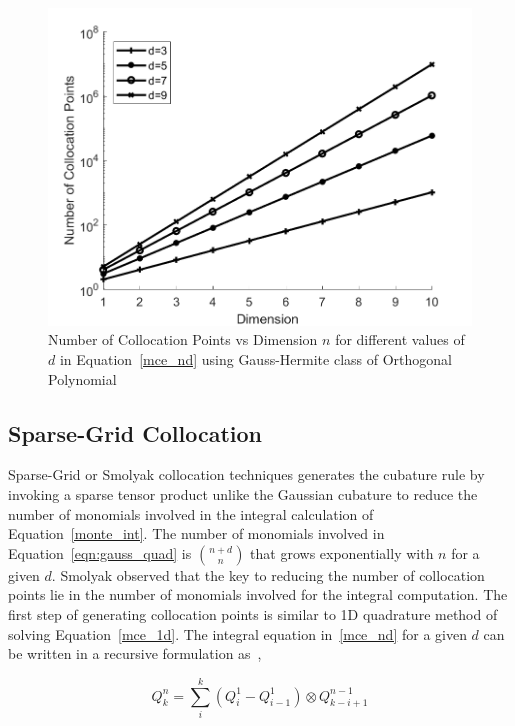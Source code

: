 \begin{figure}[H]
\centering
\includegraphics[width=\textwidth]{intr_figs/gauss_hermite}
\caption{Number of Collocation Points vs Dimension $n$ for different values of $d$ in Equation~\ref{mce_nd} using Gauss-Hermite class of Orthogonal Polynomial}
\label{fig:gauss_quad}
\end{figure}


\subsection{Sparse-Grid Collocation}

Sparse-Grid or Smolyak collocation techniques generates the cubature rule by invoking a sparse tensor product unlike the Gaussian cubature to reduce the number of monomials involved in the integral calculation of Equation~\ref{monte_int}. The number of monomials involved in Equation~\ref{eqn:gauss_quad} is $\binom{n+d}{n}$ that grows exponentially with $n$ for a given $d$. Smolyak observed that the key to reducing the number of collocation points lie in the number of monomials involved for the integral computation. The first step of generating collocation points is similar to 1D quadrature method of solving Equation~\ref{mce_1d}. The integral equation in~\ref{mce_nd} for a given $d$ can be written in a recursive formulation as~\cite{gerstner1998numerical},

\begin{equation}
\label{mce_sparse}
Q_k^n = \sum_i^k (Q_i^1 - Q_{i-1}^1) \otimes Q^{n-1}_{k-i+1} 
\end{equation}

